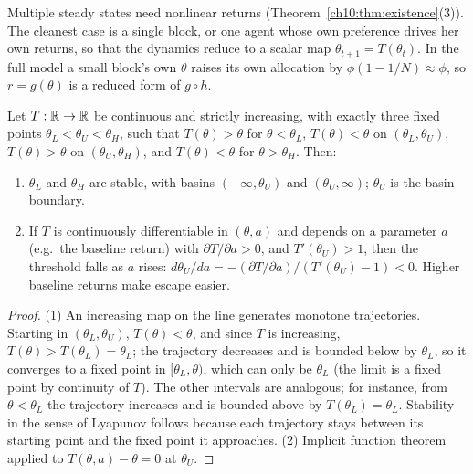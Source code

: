 \documentclass[../structural_economics_book.tex]{subfiles}
\begin{document}
Multiple steady states need nonlinear returns (Theorem~\ref{ch10:thm:existence}(3)). The cleanest case is a single block, or one agent whose own preference drives her own returns, so that the dynamics reduce to a scalar map $\theta_{t+1} = T(\theta_t)$. In the full model a small block's own $\theta$ raises its own allocation by $\phi(1 - 1/N) \approx \phi$, so $r = g(\theta)$ is a reduced form of $g \circ h$.

\begin{proposition}\label{ch10:prop:basin}
Let $T: \mathbb{R} \to \mathbb{R}$ be continuous and strictly increasing, with exactly three fixed points $\theta_L < \theta_U < \theta_H$, such that $T(\theta) > \theta$ for $\theta < \theta_L$, $T(\theta) < \theta$ on $(\theta_L, \theta_U)$, $T(\theta) > \theta$ on $(\theta_U, \theta_H)$, and $T(\theta) < \theta$ for $\theta > \theta_H$. Then:
\begin{enumerate}
\item $\theta_L$ and $\theta_H$ are stable, with basins $(-\infty, \theta_U)$ and $(\theta_U, \infty)$; $\theta_U$ is the basin boundary.
\item If $T$ is continuously differentiable in $(\theta, a)$ and depends on a parameter $a$ (e.g.\ the baseline return) with $\partial T/\partial a > 0$, and $T'(\theta_U) > 1$, then the threshold falls as $a$ rises: $d\theta_U/da = -(\partial T/\partial a)/(T'(\theta_U) - 1) < 0$. Higher baseline returns make escape easier.
\end{enumerate}
\end{proposition}

\begin{proof}
(1) An increasing map on the line generates monotone trajectories. Starting in $(\theta_L, \theta_U)$, $T(\theta) < \theta$, and since $T$ is increasing, $T(\theta) > T(\theta_L) = \theta_L$; the trajectory decreases and is bounded below by $\theta_L$, so it converges to a fixed point in $[\theta_L, \theta)$, which can only be $\theta_L$ (the limit is a fixed point by continuity of $T$). The other intervals are analogous; for instance, from $\theta < \theta_L$ the trajectory increases and is bounded above by $T(\theta_L) = \theta_L$. Stability in the sense of Lyapunov follows because each trajectory stays between its starting point and the fixed point it approaches. (2) Implicit function theorem applied to $T(\theta, a) - \theta = 0$ at $\theta_U$.
\end{proof}
\end{document}
